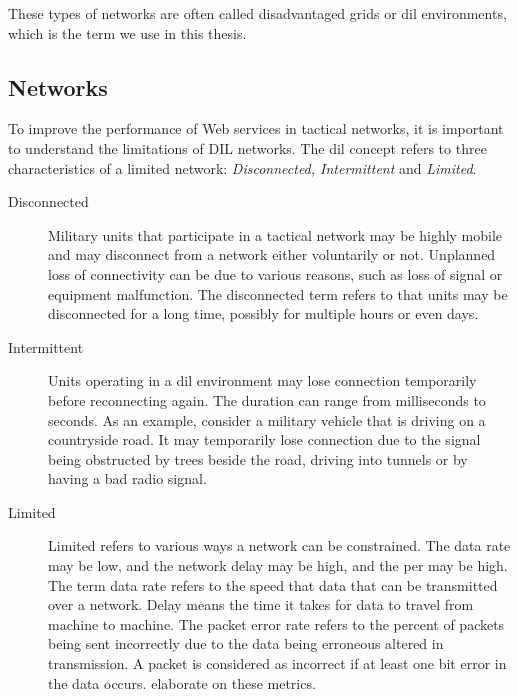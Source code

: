These types of networks are often called disadvantaged grids or \gls{dil}
environments, which is the term we use in this thesis.

\subsection{ Networks}
\label{dil}

To improve the performance of Web services in tactical networks, it is important
to understand the limitations of DIL networks. The \gls{dil} concept refers to
three characteristics of a limited network: \textit{Disconnected, Intermittent}
and \textit{Limited}.

\begin{description}
\item[Disconnected]

Military units that participate in a tactical network may be highly mobile and
may disconnect from a network either voluntarily or not. Unplanned loss of
connectivity can be due to various reasons, such as loss of signal or equipment
malfunction. The disconnected term refers to that units may be disconnected for
a long time, possibly for multiple hours or even days.

\item[Intermittent]

Units operating in a \gls{dil} environment may lose connection temporarily
before reconnecting again. The duration can range from milliseconds to seconds.
As an example, consider a military vehicle that is driving on a countryside
road. It may temporarily lose connection due to the signal being obstructed by
trees beside the road, driving into tunnels or by having a bad radio signal.

\item[Limited] Limited refers to various ways a network can be constrained. The
data rate may be low, and the network delay may be high, and the \gls{per} may
be high. The term data rate refers to the speed that data that can be
transmitted over a network. Delay means the time it takes for data to travel
from machine to machine. The packet error rate refers to the percent of packets
being sent incorrectly due to the data being erroneous altered in transmission.
A packet is considered as incorrect if at least one bit error in the data
occurs.  elaborate on these metrics.

\end{description}


